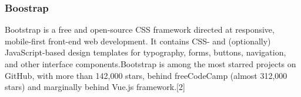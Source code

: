 \subsubsection{Boostrap}
Bootstrap is a free and open-source CSS framework directed at responsive, mobile-first front-end web development. 
It contains CSS- and (optionally) JavaScript-based design templates for typography, forms, buttons, navigation, and 
other interface components.Bootstrap is among the most starred projects on GitHub, with more than 142,000 stars, behind 
freeCodeCamp (almost 312,000 stars) and marginally behind Vue.js framework.[2] 
